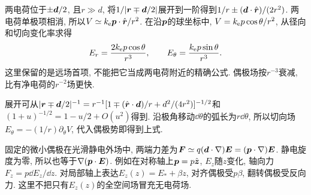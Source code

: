 两电荷位于$\pm\boldsymbol{d}/2$, 且$r\gg d$, 将$1/|\boldsymbol{r}\mp\boldsymbol{d}/2|$展开到一阶得到$1/r\pm(\boldsymbol{d}\cdot\hat{\boldsymbol{r}})/(2r^2)$. 两电荷单极项相消, 所以$V\simeq k_{\mathrm e}\boldsymbol{p}\cdot\hat{\boldsymbol{r}}/r^2$. 在沿$\boldsymbol{p}$的球坐标中, $V=k_{\mathrm e} p\cos\theta/r^2$, 从径向和切向变化率求得
\[
E_r=\frac{2k_{\mathrm e} p\cos\theta}{r^3},\qquad E_\theta=\frac{k_{\mathrm e} p\sin\theta}{r^3}.
\]
这里保留的是远场首项, 不能把它当成两电荷附近的精确公式. 偶极场按$r^{-3}$衰减, 比有净电荷的$r^{-2}$场更快.


展开可从$|\boldsymbol{r}\mp\boldsymbol{d}/2|^{-1}=r^{-1}[1\mp(\hat{\boldsymbol{r}}\cdot\boldsymbol{d})/r+d^2/(4r^2)]^{-1/2}$和$(1+u)^{-1/2}=1-u/2+O(u^2)$得到. 沿极角移动$\dd\theta$的弧长为$r\dd\theta$, 所以切向场$E_\theta=-(1/r)\partial_\theta V$, 代入偶极势即得到上式.

固定的微小偶极在光滑静电外场中, 两端力差为$\boldsymbol{F}\simeq q(\boldsymbol{d}\cdot\nabla)\boldsymbol{E}=(\boldsymbol{p}\cdot\nabla)\boldsymbol{E}$. 静电旋度为零, 所以也等于$\nabla(\boldsymbol{p}\cdot\boldsymbol{E})$. 例如在对称轴上$\boldsymbol{p}=p\hat{\boldsymbol{z}}$, $E_z$随$z$变化, 轴向力$F_z=p\dd E_z/\dd z$. 对局部轴上表达$E_z(z)=E_*+\beta z$, 对齐偶极受$p\beta$, 翻转偶极受反向力. 这里不把只有$E_z(z)$的全空间场冒充无电荷场.
